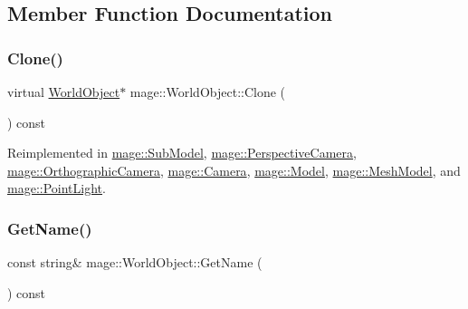 \subsection{Member Function Documentation}
\hypertarget{classmage_1_1_world_object_a8793d22cb63b1bd31b1307e5e7094f61}{}\label{classmage_1_1_world_object_a8793d22cb63b1bd31b1307e5e7094f61} 
\subsubsection{\texorpdfstring{Clone()}{Clone()}}
{\footnotesize\ttfamily virtual \hyperlink{classmage_1_1_world_object}{World\+Object}$\ast$ mage\+::\+World\+Object\+::\+Clone (\begin{DoxyParamCaption}{ }\end{DoxyParamCaption}) const\hspace{0.3cm}{\ttfamily [virtual]}}



Reimplemented in \hyperlink{classmage_1_1_sub_model_a368bcc2ee819cc29ec0203e314ae91d3}{mage\+::\+Sub\+Model}, \hyperlink{classmage_1_1_perspective_camera_a08eebf7f3ba10a46b4b23c0ded1192f2}{mage\+::\+Perspective\+Camera}, \hyperlink{classmage_1_1_orthographic_camera_ae075c08e4af88f74212bf5c84d2e5b2a}{mage\+::\+Orthographic\+Camera}, \hyperlink{classmage_1_1_camera_a19301c2256c183db50b5e9406f7b5f3c}{mage\+::\+Camera}, \hyperlink{classmage_1_1_model_ae5e9bee52da0db8c7a29920c13ed40ea}{mage\+::\+Model}, \hyperlink{classmage_1_1_mesh_model_a7130eca9a1dac038c33b838c15138161}{mage\+::\+Mesh\+Model}, and \hyperlink{classmage_1_1_point_light_a5a685d110af3ec491105147a15df7b87}{mage\+::\+Point\+Light}.

\hypertarget{classmage_1_1_world_object_a3aab270d50a8d9ab1f9a970d3e04245f}{}\label{classmage_1_1_world_object_a3aab270d50a8d9ab1f9a970d3e04245f} 
\subsubsection{\texorpdfstring{Get\+Name()}{GetName()}}
{\footnotesize\ttfamily const string\& mage\+::\+World\+Object\+::\+Get\+Name (\begin{DoxyParamCaption}{ }\end{DoxyParamCaption}) const}

